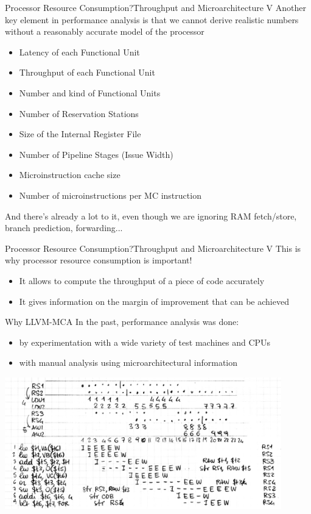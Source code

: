 \begin{frame}{Processor Resource Consumption?}{Throughput and Microarchitecture V}
Another key element in performance analysis is that \alert{we cannot derive realistic numbers without a reasonably accurate model of the processor}

\begin{itemize}
\item Latency of each Functional Unit
\item Throughput of each Functional Unit
\item Number and kind of Functional Units
\item Number of Reservation Stations
\item Size of the Internal Register File
\item Number of Pipeline Stages (Issue Width)
\item Microinstruction cache size
\item Number of microinstructions per MC instruction
\end{itemize}

{\footnotesize And there's already a lot to it, even though we are ignoring RAM fetch/store, branch prediction, forwarding...}
\end{frame}


\begin{frame}{Processor Resource Consumption?}{Throughput and Microarchitecture V}
This is why \alert{processor resource consumption} is important!
\bigskip
\begin{itemize}
\item It allows to compute the throughput of a piece of code accurately
\item It gives information on the \alert{margin of improvement} that can be achieved
\end{itemize}
\end{frame}


\begin{frame}{Why LLVM-MCA}
In the past, performance analysis was done:
\begin{itemize}
\item by \alert{experimentation} with a wide variety of test machines and CPUs
\item with \alert{manual analysis} using microarchitectural information
\end{itemize}

\begin{centering}
\includegraphics[width=0.9\textwidth]{img/manual-perf-analysis.jpg}\\
\end{centering}
\end{frame}


